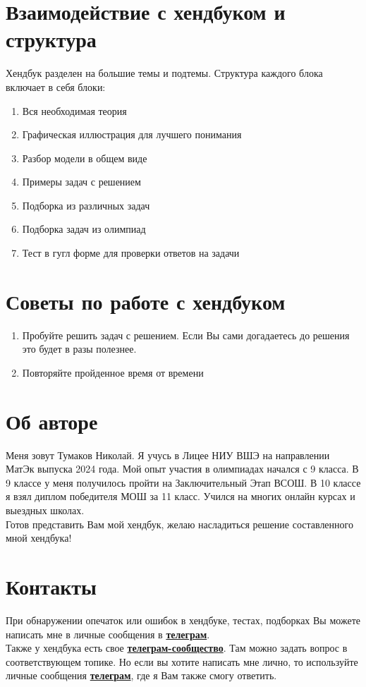 \section{Взаимодействие с хендбуком и структура}
\indent\setlength{\parindent}{1em}Хендбук разделен на большие темы и подтемы. Структура каждого блока включает в себя блоки:
\begin{enumerate}
    \item Вся необходимая теория
    \item Графическая иллюстрация для лучшего понимания
    \item Разбор модели в общем виде
    \item Примеры задач с решением
    \item Подборка из различных задач
    \item Подборка задач из олимпиад
    \item Тест в гугл форме для проверки ответов на задачи
\end{enumerate}

\section{Советы по работе с хендбуком}
\begin{enumerate}
    \item Пробуйте решить задач с решением. Если Вы сами догадаетесь до решения это будет в разы полезнее.
    \item Повторяйте пройденное время от времени
\end{enumerate}

\section{Об авторе}
\indent\setlength{\parindent}{1em}Меня зовут Тумаков Николай. Я учусь в Лицее НИУ ВШЭ на направлении МатЭк выпуска 2024 года. Мой опыт участия в олимпиадах начался с 9 класса. В 9 классе у меня получилось пройти на Заключительный Этап ВСОШ. В 10 классе я взял диплом победителя МОШ за 11 класс. Учился на многих онлайн курсах и выездных школах. \\
\indent\setlength{\parindent}{1em}Готов представить Вам мой хендбук, желаю насладиться решение составленного мной хендбука!

\section{Контакты}
\indent\setlength{\parindent}{1em}При обнаружении опечаток или ошибок в хендбуке, тестах, подборках Вы можете написать мне в личные сообщения в \textbf{\href{https://t.me/nntumakov}{телеграм}}.\\
\indent\setlength{\parindent}{1em}Также у хендбука есть свое \textbf{\href{https://t.me/econ_handbook_screening}{телеграм-сообщество}}. Там можно задать вопрос в соответствующем топике. Но если вы хотите написать мне лично, то используйте личные сообщения \textbf{\href{https://t.me/nntumakov}{телеграм}}, где я Вам также смогу ответить.

